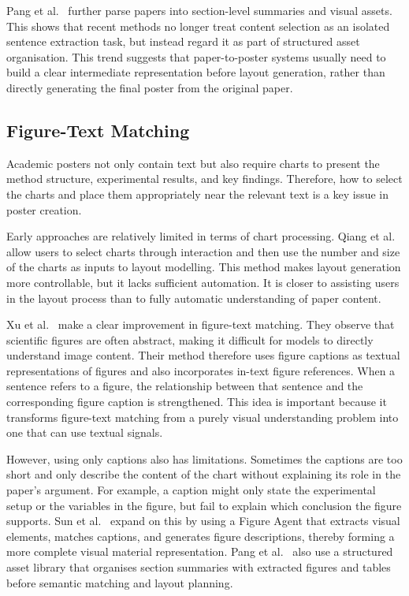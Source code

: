 \documentclass[12pt,oneside]{report}
\begin{document}
Pang et al.~\cite{paper2poster} further parse papers into section-level summaries and visual assets. This shows that recent methods no longer treat content selection as an isolated sentence extraction task, but instead regard it as part of structured asset organisation. This trend suggests that paper-to-poster systems usually need to build a clear intermediate representation before layout generation, rather than directly generating the final poster from the original paper.

\subsection{Figure-Text Matching}

Academic posters not only contain text but also require charts to present the method structure, experimental results, and key findings. Therefore, how to select the charts and place them appropriately near the relevant text is a key issue in poster creation.

\vspace{1em}

Early approaches are relatively limited in terms of chart processing. Qiang et al.~\cite{poster2016} allow users to select charts through interaction and then use the number and size of the charts as inputs to layout modelling. This method makes layout generation more controllable, but it lacks sufficient automation. It is closer to assisting users in the layout process than to fully automatic understanding of paper content.

\vspace{1em}

Xu et al.~\cite{posterbot} make a clear improvement in figure-text matching. They observe that scientific figures are often abstract, making it difficult for models to directly understand image content. Their method therefore uses figure captions as textual representations of figures and also incorporates in-text figure references. When a sentence refers to a figure, the relationship between that sentence and the corresponding figure caption is strengthened. This idea is important because it transforms figure-text matching from a purely visual understanding problem into one that can use textual signals.

\vspace{1em}

However, using only captions also has limitations. Sometimes the captions are too short and only describe the content of the chart without explaining its role in the paper's argument. For example, a caption might only state the experimental setup or the variables in the figure, but fail to explain which conclusion the figure supports. Sun et al.~\cite{p2p} expand on this by using a Figure Agent that extracts visual elements, matches captions, and generates figure descriptions, thereby forming a more complete visual material representation. Pang et al.~\cite{paper2poster} also use a structured asset library that organises section summaries with extracted figures and tables before semantic matching and layout planning.
\end{document}
